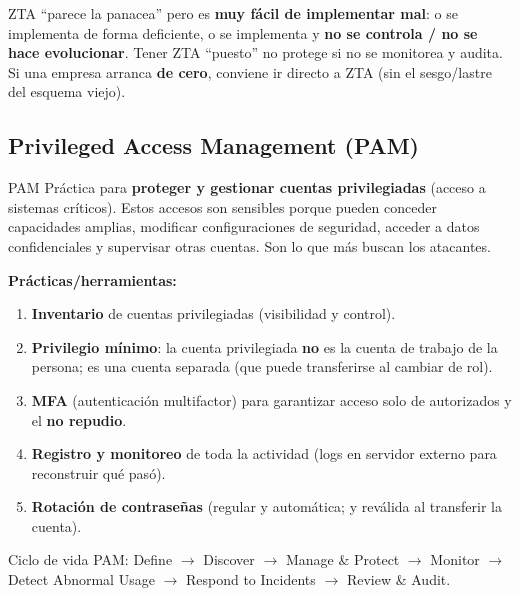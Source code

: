 \documentclass[../main.tex]{subfiles}
\begin{document}

\begin{ojo}
ZTA ``parece la panacea'' pero es \textbf{muy fácil de implementar mal}: o se
implementa de forma deficiente, o se implementa y \textbf{no se controla / no se
hace evolucionar}. Tener ZTA ``puesto'' no protege si no se monitorea y audita.
Si una empresa arranca \textbf{de cero}, conviene ir directo a ZTA (sin el
sesgo/lastre del esquema viejo).
\end{ojo}

\subsection{Privileged Access Management (PAM)}

\begin{definicion}{PAM}
Práctica para \textbf{proteger y gestionar cuentas privilegiadas} (acceso a
sistemas críticos). Estos accesos son sensibles porque pueden conceder
capacidades amplias, modificar configuraciones de seguridad, acceder a datos
confidenciales y supervisar otras cuentas. Son lo que más buscan los atacantes.
\end{definicion}

\textbf{Prácticas/herramientas:}
\begin{enumerate}
  \item \textbf{Inventario} de cuentas privilegiadas (visibilidad y control).
  \item \textbf{Privilegio mínimo}: la cuenta privilegiada \textbf{no} es la
    cuenta de trabajo de la persona; es una cuenta separada (que puede
    transferirse al cambiar de rol).
  \item \textbf{MFA} (autenticación multifactor) para garantizar acceso solo de
    autorizados y el \textbf{no repudio}.
  \item \textbf{Registro y monitoreo} de toda la actividad (logs en servidor
    externo para reconstruir qué pasó).
  \item \textbf{Rotación de contraseñas} (regular y automática; y reválida al
    transferir la cuenta).
\end{enumerate}
Ciclo de vida PAM: Define $\to$ Discover $\to$ Manage \& Protect $\to$ Monitor
$\to$ Detect Abnormal Usage $\to$ Respond to Incidents $\to$ Review \& Audit.
\end{document}
